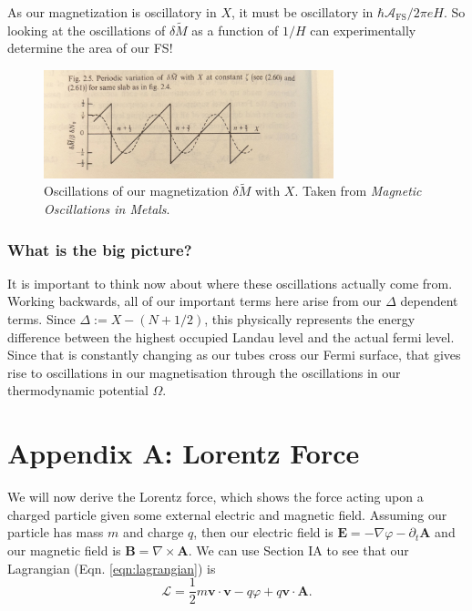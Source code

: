 \documentclass[12pt]{revtex4-2}
\begin{document}
As our magnetization is oscillatory in $X$, it must be oscillatory in $\hbar\mathcal{A}_\text{FS}/2\pi eH$.  So looking at the oscillations of $\delta \tilde{M}$ as a function of $1/H$ can experimentally determine the area of our FS!

\begin{figure}[tb]
\centering
\includegraphics[width=0.75\textwidth]{figures/oscillations_magnetization.jpg}
\caption{Oscillations of our magnetization $\delta \tilde{M}$ with $X$.  Taken from \textit{Magnetic Oscillations in Metals}.}
\label{fig:oscillations-mag}
\end{figure}

\subsubsection*{What is the big picture?}
It is important to think now about where these oscillations actually come from.  Working backwards, all of our important terms here arise from our $\Delta$ dependent terms.  Since $\Delta := X - (N + 1/2)$, this physically represents the energy difference between the highest occupied Landau level and the actual fermi level.  Since that is constantly changing as our tubes cross our Fermi surface, that gives rise to oscillations in our magnetisation through the oscillations in our thermodynamic potential $\Omega$.  

\newpage
\section{Appendix A: Lorentz Force}
We will now derive the Lorentz force, which shows the force acting upon a charged particle given some external electric and magnetic field.  Assuming our particle has mass $m$ and charge $q$, then our electric field is $\mathbf{E} = -\nabla\varphi - \partial_t\mathbf{A}$ and our magnetic field is $\mathbf{B} = \nabla\times\mathbf{A}$.  We can use Section IA to see that our Lagrangian (Eqn. \ref{eqn:lagrangian}) is 
\begin{equation}
    \mathcal{L} = \frac{1}{2}m\mathbf{v}\cdot\mathbf{v} - q\varphi + q\mathbf{v} \cdot \mathbf{A}.
\end{equation}
\end{document}
